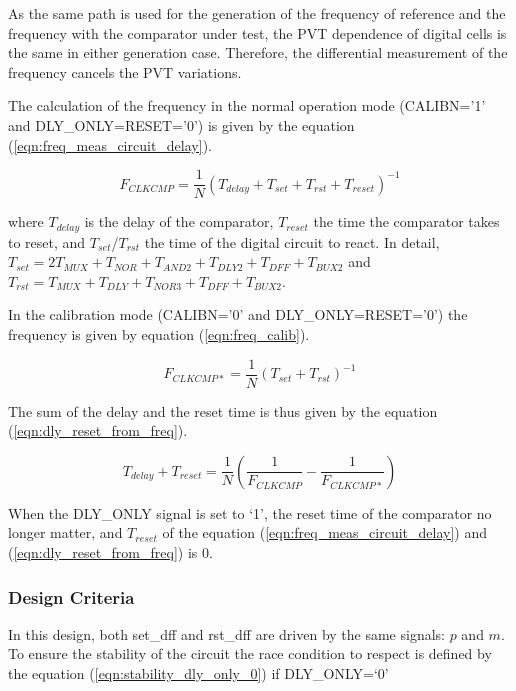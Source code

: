 As the same path is used for the generation of the frequency of reference and the frequency with the comparator under test, the PVT dependence of digital cells is the same in either generation case. Therefore, the differential measurement of the frequency cancels the PVT variations.

The calculation of the frequency in the normal operation mode (CALIBN='1' and DLY\_ONLY=RESET='0') is given by the equation (\ref{eqn:freq_meas_circuit_delay}).

\begin{equation} \label{eqn:freq_meas_circuit_delay}
F_{CLKCMP} = \frac{1}{N} {\left(T_{delay}+T_{set}+T_{rst}+T_{reset}\right)}^{-1}
\end{equation}

where $T_{delay}$ is the delay of the comparator, $T_{reset}$ the time the comparator takes to reset, and $T_{set}$/$T_{rst}$ the time of the digital circuit to react. In detail, $T_{set} = 2 T_{MUX} + T_{NOR} + T_{AND2} + T_{DLY2} + T_{DFF} + T_{BUX2}$ and $T_{rst} = T_{MUX} + T_{DLY} + T_{NOR3} + T_{DFF} + T_{BUX2}$.

In the calibration mode (CALIBN='0' and DLY\_ONLY=RESET='0') the frequency is given by equation (\ref{eqn:freq_calib}).

\begin{equation} \label{eqn:freq_calib}
F_{CLKCMP*} = \frac{1}{N} \left(T_{set}+T_{rst}\right)^{-1}
\end{equation}

The sum of the delay and the reset time is thus given by the equation (\ref{eqn:dly_reset_from_freq}).

\begin{equation}
\label{eqn:dly_reset_from_freq}
T_{delay}+T_{reset} = \frac{1}{N} \left( \frac{1}{F_{CLKCMP}} - \frac{1}{F_{CLKCMP*}} \right)
\end{equation}

When the DLY\_ONLY signal is set to `1', the reset time of the comparator no longer matter, and $T_{reset}$ of the equation (\ref{eqn:freq_meas_circuit_delay}) and (\ref{eqn:dly_reset_from_freq}) is 0.

\subsubsection{Design Criteria}
In this design, both set\_dff and rst\_dff are driven by the same signals: $p$ and $m$. To ensure the stability of the circuit the race condition to respect is defined by the equation (\ref{eqn:stability_dly_only_0}) if DLY\_ONLY=`0' 

